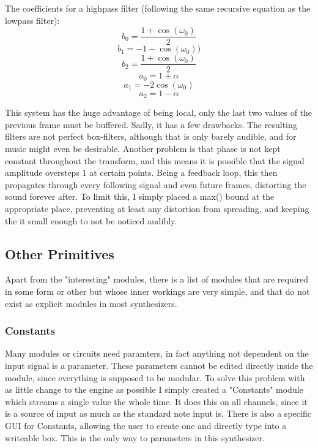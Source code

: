 \documentclass[11pt,a4paper]{article}
\begin{document}
The coefficients for a highpass filter (following the same recursive equation as the lowpass filter):
\begin{equation}
b_0 = \frac{1 + \cos(\omega_0)}{2}
\end{equation}
\begin{equation}
b_1 = -1 - \cos(\omega_0))
\end{equation}
\begin{equation}
b_2 = \frac{1 + \cos(\omega_0)}{2}
\end{equation}
\begin{equation}
a_0 = 1 + \alpha
\end{equation}
\begin{equation}
a_1 = -2\cos(\omega_0)
\end{equation}
\begin{equation}
a_2 = 1 - \alpha
\end{equation}

This system has the huge advantage of being local, only the last two values of the previous frame must be buffered.
Sadly, it has a few drawbacks. The resulting filters are not perfect box-filters, although that is only barely audible, and for music might even be desirable. Another problem is that phase is not kept constant throughout the transform, and this means it is possible that the signal amplitude oversteps 1 at certain points. Being a feedback loop, this then propagates through every following signal and even future frames, distorting the sound forever after.
To limit this, I simply placed a max() bound at the appropriate place, preventing at least any distortion from spreading, and keeping the it small enough to not be noticed audibly.

\subsection{Other Primitives}

Apart from the "interesting" modules, there is a list of modules that are required in some form or other but whose inner workings are very simple, and that do not exist as explicit modules in most synthesizers.

\subsubsection{Constants}

Many modules or circuits need paramters, in fact anything not dependent on the input signal is a parameter. These parameters cannot be edited directly inside the module, since everything is supposed to be modular. To solve this problem with as little change to the engine as possible I simply created a "Constants" module which streams a single value the whole time. It does this on all channels, since it is a source of input as much as the standard note input is. There is also a specific GUI for Constants, allowing the user to create one and directly type into a writeable box. This is the only way to parameters in this synthesizer.
\end{document}
